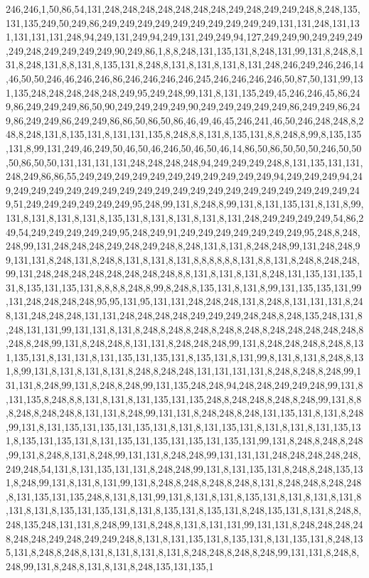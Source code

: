246,246,1,50,86,54,131,248,248,248,248,248,248,248,249,248,249,249,248,8,248,135,131,135,249,50,249,86,249,249,249,249,249,249,249,249,249,249,131,131,248,131,131,131,131,131,248,94,249,131,249,94,249,131,249,249,94,127,249,249,90,249,249,249,249,248,249,249,249,249,90,249,86,1,8,8,248,131,135,131,8,248,131,99,131,8,248,8,131,8,248,131,8,8,131,8,135,131,8,248,8,131,8,131,8,131,8,131,248,246,249,246,246,14,46,50,50,246,46,246,246,86,246,246,246,246,245,246,246,246,246,50,87,50,131,99,131,135,248,248,248,248,248,249,95,249,248,99,131,8,131,135,249,45,246,246,45,86,249,86,249,249,249,86,50,90,249,249,249,249,90,249,249,249,249,249,86,249,249,86,249,86,249,249,86,249,249,86,86,50,86,50,86,46,49,46,45,246,241,46,50,246,248,248,8,248,8,248,131,8,135,131,8,131,131,135,8,248,8,8,131,8,135,131,8,8,248,8,99,8,135,135,131,8,99,131,249,46,249,50,46,50,46,246,50,46,50,46,14,86,50,86,50,50,50,246,50,50,50,86,50,50,131,131,131,131,248,248,248,248,94,249,249,249,248,8,131,135,131,131,248,249,86,86,55,249,249,249,249,249,249,249,249,249,249,249,94,249,249,249,94,249,249,249,249,249,249,249,249,249,249,249,249,249,249,249,249,249,249,249,249,249,51,249,249,249,249,249,249,95,248,99,131,8,248,8,99,131,8,131,135,131,8,131,8,99,131,8,131,8,131,8,131,8,135,131,8,131,8,131,8,131,8,131,248,249,249,249,249,54,86,249,54,249,249,249,249,249,95,248,249,91,249,249,249,249,249,249,249,95,248,8,248,248,99,131,248,248,248,249,248,249,248,8,248,131,8,131,8,248,248,99,131,248,248,99,131,131,8,248,131,8,248,8,131,8,131,8,131,8,8,8,8,8,8,131,8,8,131,8,248,8,248,248,99,131,248,248,248,248,248,248,248,248,8,8,131,8,131,8,131,8,248,131,135,131,135,131,8,135,131,135,131,8,8,8,8,248,8,99,8,248,8,135,131,8,131,8,99,131,135,135,131,99,131,248,248,248,248,95,95,131,95,131,131,248,248,248,131,8,248,8,131,131,131,8,248,131,248,248,248,131,131,248,248,248,248,249,249,249,248,248,8,248,135,248,131,8,248,131,131,99,131,131,8,131,8,248,8,248,8,248,8,248,8,248,8,248,248,248,248,248,8,248,8,248,99,131,8,248,248,8,131,131,8,248,248,248,99,131,8,248,248,248,8,248,8,131,135,131,8,131,131,8,131,135,131,135,131,8,135,131,8,131,99,8,131,8,131,8,248,8,131,8,99,131,8,131,8,131,8,131,8,248,8,248,248,131,131,131,131,8,248,8,248,8,248,99,131,131,8,248,99,131,8,248,8,248,99,131,135,248,248,94,248,248,249,249,248,99,131,8,131,135,8,248,8,8,131,8,131,8,131,135,131,135,248,8,248,248,8,248,8,248,99,131,8,8,8,248,8,248,248,8,131,131,8,248,99,131,131,8,248,248,8,248,131,135,131,8,131,8,248,99,131,8,131,135,131,135,131,135,131,8,131,8,131,135,131,8,131,8,131,8,131,135,131,8,135,131,135,131,8,131,135,131,135,131,135,131,135,131,99,131,8,248,8,248,8,248,99,131,8,248,8,131,8,248,99,131,131,8,248,248,99,131,131,131,248,248,248,248,248,249,248,54,131,8,131,135,131,131,8,248,248,99,131,8,131,135,131,8,248,8,248,135,131,8,248,99,131,8,131,8,131,99,131,8,248,8,248,8,248,8,248,8,131,8,248,248,8,248,248,8,131,135,131,135,248,8,131,8,131,99,131,8,131,8,131,8,135,131,8,131,8,131,8,131,8,131,8,131,8,135,131,135,131,8,131,8,135,131,8,135,131,8,248,135,131,8,131,8,248,8,248,135,248,131,131,8,248,99,131,8,248,8,131,8,131,131,99,131,131,8,248,248,248,248,248,248,249,248,249,249,248,8,131,8,131,135,131,8,135,131,8,131,135,131,8,248,135,131,8,248,8,248,8,131,8,131,8,131,8,131,8,248,248,8,248,8,248,99,131,131,8,248,8,248,99,131,8,248,8,131,8,131,8,248,135,131,135,1